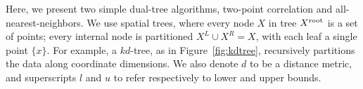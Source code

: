 \documentclass{article}
\newcommand{\spos}{^{{\scriptscriptstyle +\!}}}
\newcommand{\sneg}{^{{\scriptscriptstyle -\!}}}
\newcommand{\kdroot}[1]{#1^{\text{\rm root}}}
\newcommand{\kdleft}[1]{#1^{\!L}}
\newcommand{\kdright}[1]{#1^{\!R}}
\newcommand{\al}{a^l}
\newcommand{\au}{a^u}
\newcommand{\dl}{d^l}
\newcommand{\du}{d^u}
\newcommand{\x}{\\ \hspace{0.13in} \scriptstyle}
\newcommand{\xx}{\\ \hspace{0.26in} \scriptstyle}
\begin{document}
\begin{figure}
\begin{minipage}{3.88in}
  \end{minipage}
  \vspace{-.2in}
\end{figure}
Here, we present two simple dual-tree algorithms, two-point correlation and all-nearest-neighbors.
We use spatial trees, where every node $X$ in tree $\kdroot{X}$ is a set of points; every internal node is partitioned $\kdleft{X} \cup \kdright{X} = X$, with each leaf a single point $\{x\}$.
For example, a $kd$-tree, as in Figure~\ref{fig:kdtree}, recursively partitions the data along coordinate dimensions.
We also denote $d$ to be a distance metric, and superscripts $l$ and $u$ to refer respectively to lower and upper bounds.
\end{document}

